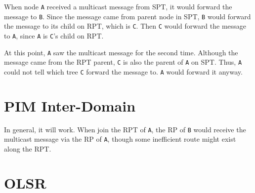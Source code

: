 \documentclass[12pt,titlepage,letterpaper]{article}
\begin{document}
When node \texttt{A} received a multicast message from SPT, it would forward
the message to \texttt{B}. Since the message came from parent node in SPT,
\texttt{B} would forward the message to its child on RPT, which is \texttt{C}.
Then \texttt{C} would forward the message to \texttt{A}, since \texttt{A} is
\texttt{C}'s child on RPT.

At this point, \texttt{A} saw the multicast message for the second time.
Although the message came from the RPT parent, \texttt{C} is also the parent of
\texttt{A} on SPT. Thus, \texttt{A} could not tell which tree \texttt{C}
forward the message to. \texttt{A} would forward it anyway.

\section{PIM Inter-Domain}

In general, it will work. When join the RPT of \texttt{A}, the RP of \texttt{B}
would receive the multicast message via the RP of \texttt{A}, though some
inefficient route might exist along the RPT.

\section{OLSR}
\end{document}
